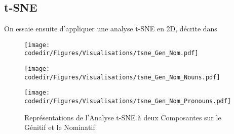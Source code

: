 \documentclass{cours}
\newcommand{\codedir}{Morphosyntactic-Categories_Code}
\begin{document}
\subsection{t-SNE}
On essaie ensuite d'appliquer une analyse t-SNE en 2D, décrite dans \cite{tSNE}
\begin{figure}[H]
    \begin{center}
        \begin{minipage}{.5\textwidth}
            \begin{center}
                \texttt{[image: \\codedir/Figures/Visualisations/tsne\_Gen\_Nom.pdf]}
            \end{center}
        \end{minipage}
    \end{center}

    \begin{minipage}{.5\textwidth}
        \begin{center}
            \texttt{[image: \\codedir/Figures/Visualisations/tsne\_Gen\_Nom\_Nouns.pdf]}
        \end{center}
    \end{minipage}
    \begin{minipage}{.5\textwidth}
        \begin{center}
            \texttt{[image: \\codedir/Figures/Visualisations/tsne\_Gen\_Nom\_Pronouns.pdf]}
        \end{center}
    \end{minipage}
    \caption{Représentations de l'Analyse t-SNE à deux Composantes sur le Génitif et le Nominatif}
\end{figure}



\newpage
\appendix




\newpage
\appendix
\tableofcontents
\listoftables
\listoffigures
\end{document}
